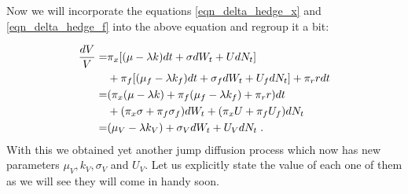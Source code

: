 \documentclass[times, utf8, diplomski]{fer}
\begin{document}
\noindent Now we will incorporate the equations \ref{eqn_delta_hedge_x} and \ref{eqn_delta_hedge_f} into the above equation and regroup it a bit:

\begin{align*}
	\frac{dV}{V} =& \pi_x [(\mu - \lambda k)dt + \sigma dW_t + UdN_t] \\&+\pi_f [(\mu_f - \lambda k_f)dt + \sigma_f dW_t + U_fdN_t] +\pi_r r dt \\
				 =& (\pi_x(\mu-\lambda k) + \pi_f (\mu_f - \lambda k_f) + \pi_r r) dt \\&+ (\pi_x\sigma + \pi_f\sigma_f)dW_t + (\pi_x U + \pi_f U_f)dN_t \\
				 =& (\mu_V - \lambda k_V) + \sigma_V dW_t + U_V dN_t \hspace{0.1cm}.
\end{align*} 
With this we obtained yet another jump diffusion process which now has new parameters $\mu_V, k_V, \sigma_V$ and $U_V$. Let us explicitly state the value of each one of them as we will see they will come in handy soon.
\end{document}

